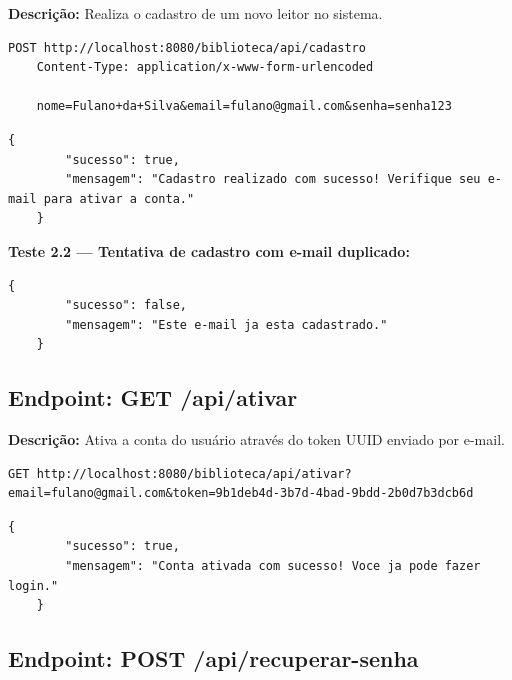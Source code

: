 \textbf{Descrição:} Realiza o cadastro de um novo leitor no sistema.

\begin{lstlisting}[style=sqlStyle, caption={Requisição: POST /api/cadastro}]
	POST http://localhost:8080/biblioteca/api/cadastro
	Content-Type: application/x-www-form-urlencoded
	
	nome=Fulano+da+Silva&email=fulano@gmail.com&senha=senha123
\end{lstlisting}

\begin{lstlisting}[style=sqlStyle, caption={Resposta esperada (HTTP 201 Created)}]
	{
		"sucesso": true,
		"mensagem": "Cadastro realizado com sucesso! Verifique seu e-mail para ativar a conta."
	}
\end{lstlisting}

\textbf{Teste 2.2 --- Tentativa de cadastro com e-mail duplicado:}

\begin{lstlisting}[style=sqlStyle, caption={Resposta esperada (HTTP 409 Conflict)}]
	{
		"sucesso": false,
		"mensagem": "Este e-mail ja esta cadastrado."
	}
\end{lstlisting}

\subsection{Endpoint: GET /api/ativar}

\textbf{Descrição:} Ativa a conta do usuário através do token UUID enviado por e-mail.

\begin{lstlisting}[style=sqlStyle, caption={Requisição: GET /api/ativar}]
	GET http://localhost:8080/biblioteca/api/ativar?email=fulano@gmail.com&token=9b1deb4d-3b7d-4bad-9bdd-2b0d7b3dcb6d
\end{lstlisting}

\begin{lstlisting}[style=sqlStyle, caption={Resposta esperada (HTTP 200 OK)}]
	{
		"sucesso": true,
		"mensagem": "Conta ativada com sucesso! Voce ja pode fazer login."
	}
\end{lstlisting}

\subsection{Endpoint: POST /api/recuperar-senha}

